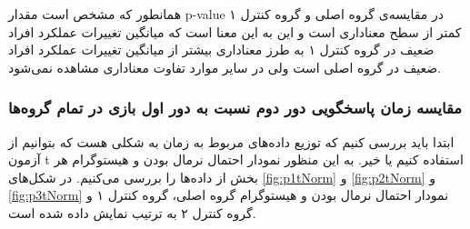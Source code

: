 \documentclass[twoside, a4paper,11pt]{book}
\numberwithin{equation}{chapter}
\numberwithin{table}{chapter}
\numberwithin{figure}{chapter}
\numberwithin{equation}{chapter}
\begin{document}
\begin{table}[]
\end{table}

همانطور که مشخص است مقدار p-value در مقایسه‌ی گروه اصلی و گروه کنترل ۱ کمتر از سطح معناداری است و این به این معنا است که میانگین تغییرات عملکرد افراد ضعیف در گروه کنترل ۱ به طرز معناداری بیشتر از میانگین تغییرات عملکرد افراد ضعیف در گروه اصلی است ولی در سایر موارد تفاوت معناداری مشاهده نمی‌شود.


\subsubsection{مقایسه زمان پاسخگویی دور دوم نسبت به دور اول بازی در تمام گروه‌ها}

ابتدا باید بررسی کنیم که توزیع داده‌های مربوط به زمان به شکلی هست که بتوانیم از آزمون t استفاده کنیم یا خیر. به این منظور نمودار احتمال نرمال بودن و هیستوگرام هر بخش از داده‌ها را بررسی می‌کنیم. در شکل‌های \ref{fig:p1tNorm} و \ref{fig:p2tNorm} و \ref{fig:p3tNorm} نمودار احتمال نرمال بودن و هیستوگرام گروه اصلی، گروه کنترل ۱ و گروه کنترل ۲ به ترتیب نمایش داده شده است.
\end{document}
